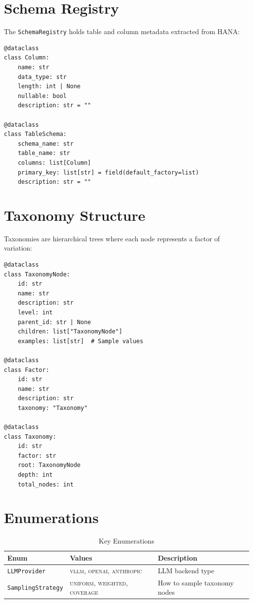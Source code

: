 \section{Schema Registry}

The \texttt{SchemaRegistry} holds table and column metadata extracted from HANA:

\begin{lstlisting}[language=jsonx,caption={Schema registry structures (schema\_registry.py)}]
@dataclass
class Column:
    name: str
    data_type: str
    length: int | None
    nullable: bool
    description: str = ""

@dataclass
class TableSchema:
    schema_name: str
    table_name: str
    columns: list[Column]
    primary_key: list[str] = field(default_factory=list)
    description: str = ""
\end{lstlisting}

\section{Taxonomy Structure}

Taxonomies are hierarchical trees where each node represents a factor of variation:

\begin{lstlisting}[language=jsonx,caption={Taxonomy structures (simula\_taxonomy\_builder.py)}]
@dataclass
class TaxonomyNode:
    id: str
    name: str
    description: str
    level: int
    parent_id: str | None
    children: list["TaxonomyNode"]
    examples: list[str]  # Sample values

@dataclass
class Factor:
    id: str
    name: str
    description: str
    taxonomy: "Taxonomy"

@dataclass
class Taxonomy:
    id: str
    factor: str
    root: TaxonomyNode
    depth: int
    total_nodes: int
\end{lstlisting}

\section{Enumerations}

\begin{table}[H]
\centering
\caption{Key Enumerations}
\label{tab:enums}
\begin{tabular}{lll}
\toprule
\textbf{Enum} & \textbf{Values} & \textbf{Description} \\
\midrule
\texttt{LLMProvider} & \textsc{vllm}, \textsc{openai}, \textsc{anthropic} & LLM backend type \\
\texttt{SamplingStrategy} & \textsc{uniform}, \textsc{weighted}, \textsc{coverage} & How to sample taxonomy nodes \\
\bottomrule
\end{tabular}
\end{table}

